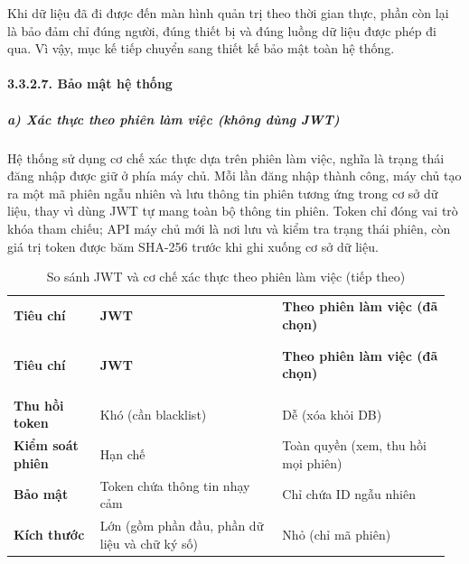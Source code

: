 \documentclass[a4paper]{extarticle}
\newcommand{\thesissettableid}[2]{%
  \renewcommand{\thetable}{#1}%
  \renewcommand{\theHtable}{#2}%
}
\begin{document}
Khi dữ liệu đã đi được đến màn hình quản trị theo thời gian thực, phần
còn lại là bảo đảm chỉ đúng người, đúng thiết bị và đúng luồng dữ liệu
được phép đi qua. Vì vậy, mục kế tiếp chuyển sang thiết kế bảo mật toàn
hệ thống.

\paragraph{3.3.2.7. Bảo mật hệ thống}\label{3237-bux1ea3o-mux1eadt-hux1ec7-thux1ed1ng-security-design}

\subparagraph{a) Xác thực theo phiên làm việc (không dùng
JWT)}\label{a-xuxe1c-thux1ef1c-session-based-khuxf4ng-duxf9ng-jwt}

Hệ thống sử dụng cơ chế xác thực dựa trên phiên làm việc, nghĩa là trạng
thái đăng nhập được giữ ở phía máy chủ. Mỗi lần đăng nhập thành công,
máy chủ tạo ra một mã phiên ngẫu nhiên và lưu thông tin phiên tương ứng
trong cơ sở dữ liệu, thay vì dùng JWT tự mang toàn bộ thông tin phiên.
Token chỉ đóng vai trò khóa tham chiếu; API máy chủ mới là nơi lưu
và kiểm tra trạng thái phiên, còn giá trị token được băm SHA-256 trước
khi ghi xuống cơ sở dữ liệu.


{\thesissettableid{3.23}{tab-ch3-so-sanh-jwt-va-session-based-authentication}
\def\LTcaptype{table}
\begin{longtable}{|L{0.190\linewidth}|L{0.403\linewidth}|L{0.372\linewidth}|}
\caption{So sánh JWT và cơ chế xác thực theo phiên làm việc}\label{tab:ch3-so-sanh-jwt-va-session-based-authentication}\\
\hline \textbf{Tiêu chí} & \textbf{JWT} & \textbf{Theo phiên làm việc (đã chọn)} \\
\\\hline
\endfirsthead
\caption[]{So sánh JWT và cơ chế xác thực theo phiên làm việc (tiếp theo)}\\
\hline \textbf{Tiêu chí} & \textbf{JWT} & \textbf{Theo phiên làm việc (đã chọn)} \\
\\\hline
\endhead
\\\hline
\endfoot
\endlastfoot
\textbf{Thu hồi token} & Khó (cần blacklist) & Dễ (xóa khỏi DB) \\\hline
\textbf{Kiểm soát phiên} & Hạn chế & Toàn quyền (xem, thu hồi mọi
phiên) \\\hline
\textbf{Bảo mật} & Token chứa thông tin nhạy cảm & Chỉ chứa ID ngẫu
nhiên \\\hline
\textbf{Kích thước} & Lớn (gồm phần đầu, phần dữ liệu và chữ ký số) & Nhỏ (chỉ
mã phiên) \\\hline
\end{longtable}
}
\end{document}
